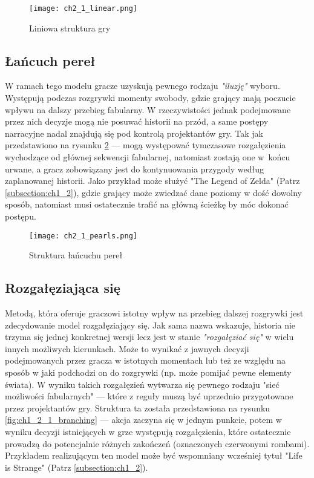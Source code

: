 \begin{figure}[h]
    \texttt{[image: ch2\_1\_linear.png]}
    \caption{Liniowa struktura gry\cite{narrative_structures}}
    \centering
    \label{fig:ch1_2_1_linear}
\end{figure}

\subsection{Łańcuch pereł}

W ramach tego modelu gracze uzyskują pewnego rodzaju \textit{"iluzję"} wyboru. Występują podczas
rozgrywki momenty swobody, gdzie grający mają poczucie wpływu na dalszy przebieg fabularny. W
rzeczywistości jednak podejmowane przez nich decyzje mogą nie posuwać historii na przód, a same
postępy narracyjne nadal znajdują się pod kontrolą projektantów gry\cite{theorising_narrative}.
Tak jak przedstawiono na rysunku \ref{fig:ch1_2_1_pearls} --- mogą występować tymczasowe rozgałęzienia
wychodzące od głównej sekwencji fabularnej, natomiast zostają one w~końcu urwane, a gracz zobowiązany
jest do kontynuowania przygody według zaplanowanej historii. Jako przykład może służyć "The Legend
of Zelda" (Patrz \ref{subsection:ch1_2}), gdzie grający może zwiedzać dane poziomy w dość dowolny
sposób, natomiast musi ostatecznie trafić na główną ścieżkę by móc dokonać postępu.

\begin{figure}[h]
    \texttt{[image: ch2\_1\_pearls.png]}
    \caption{Struktura łańcuchu pereł}
    \centering
    \label{fig:ch1_2_1_pearls}
\end{figure}

\subsection{Rozgałęziająca się}

Metodą, która oferuje graczowi istotny wpływ na przebieg dalszej rozgrywki jest zdecydowanie
model rozgałęziający się. Jak sama nazwa wskazuje, historia nie trzyma się jednej konkretnej wersji
lecz jest w stanie \textit{"rozgałęziać się"} w wielu innych możliwych kierunkach. Może to wynikać
z jawnych decyzji podejmowanych przez gracza w istotnych momentach lub też ze względu na sposób
w jaki podchodzi on do rozgrywki (np. może pomijać pewne elementy świata)\cite{theorising_narrative}.
W wyniku takich rozgałęzień wytwarza się pewnego rodzaju "sieć możliwości fabularnych"\cite{theorising_narrative}
--- które z reguły muszą być uprzednio przygotowane przez projektantów gry. Struktura ta została
przedstawiona na rysunku \ref{fig:ch1_2_1_branching} --- akcja zaczyna się w jednym punkcie, potem
w wyniku decyzji istniejących w grze występują rozgałęzienia, które ostatecznie prowadzą do potencjalnie
różnych zakończeń (oznaczonych czerwonymi rombami). Przykładem realizującym ten model może być
wspomniany wcześniej tytuł "Life is Strange" (Patrz \ref{subsection:ch1_2}).


